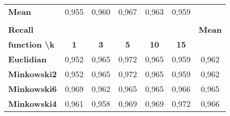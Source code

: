 \documentclass[a4paper,11pt]{report}
\begin{document}
\begin{table}[]
\begin{center}
\begin{tabular}{lcccccc}
      \multicolumn{1}{|l|}{\textbf{Mean}}                      & \multicolumn{1}{c|}{0,955}      & \multicolumn{1}{c|}{0,960}      & \multicolumn{1}{c|}{0,967}      & \multicolumn{1}{c|}{0,963}       & \multicolumn{1}{c|}{0,959}       &                                   \\ \cline{1-6}
                                                                                                                                                                                                                                           & \multicolumn{1}{l}{}            & \multicolumn{1}{l}{}            & \multicolumn{1}{l}{}            & \multicolumn{1}{l}{}             & \multicolumn{1}{l}{}             & \multicolumn{1}{l}{}              \\
      \multicolumn{6}{l}{\textbf{Recall}}                                                                                                                                                                                                  & \multicolumn{1}{l}{\textbf{Mean}} \\ \cline{1-6}
      \multicolumn{1}{|l|}{\textbf{function \textbackslash k}} & \multicolumn{1}{c|}{\textbf{1}} & \multicolumn{1}{c|}{\textbf{3}} & \multicolumn{1}{c|}{\textbf{5}} & \multicolumn{1}{c|}{\textbf{10}} & \multicolumn{1}{c|}{\textbf{15}} &                                   \\ \hline
      \multicolumn{1}{|l|}{\textbf{Euclidian}}                 & \multicolumn{1}{c|}{0,952}      & \multicolumn{1}{c|}{0,965}      & \multicolumn{1}{c|}{0,972}      & \multicolumn{1}{c|}{0,965}       & \multicolumn{1}{c|}{0,959}       & \multicolumn{1}{c|}{0,962}        \\ \hline
      \multicolumn{1}{|l|}{\textbf{Minkowski2}}                & \multicolumn{1}{c|}{0,952}      & \multicolumn{1}{c|}{0,965}      & \multicolumn{1}{c|}{0,972}      & \multicolumn{1}{c|}{0,965}       & \multicolumn{1}{c|}{0,959}       & \multicolumn{1}{c|}{0,962}        \\ \hline
      \multicolumn{1}{|l|}{\textbf{Minkowski6}}                & \multicolumn{1}{c|}{0,969}      & \multicolumn{1}{c|}{0,962}      & \multicolumn{1}{c|}{0,965}      & \multicolumn{1}{c|}{0,965}       & \multicolumn{1}{c|}{0,966}       & \multicolumn{1}{c|}{0,965}        \\ \hline
      \multicolumn{1}{|l|}{\textbf{Minkowski4}}                & \multicolumn{1}{c|}{0,961}      & \multicolumn{1}{c|}{0,958}      & \multicolumn{1}{c|}{0,969}      & \multicolumn{1}{c|}{0,969}       & \multicolumn{1}{c|}{0,972}       & \multicolumn{1}{c|}{0,966}        \\ \hline

\end{tabular}
\end{center}
\end{table}
\end{document}
